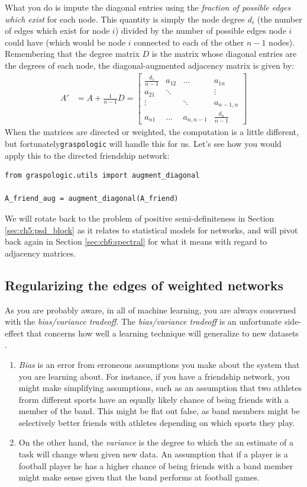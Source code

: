 What you do is impute the diagonal entries using the \emph{fraction of possible edges which exist} for each node. This quantity is simply the node degree $d_i$ (the number of edges which exist for node $i$) divided by the number of possible edges node $i$ could have (which would be node $i$ connected to each of the other $n-1$ nodes). Remembering that the degree matrix $D$ is the matrix whose diagonal entries are the degrees of each node, the diagonal-augmented adjacency matrix is given by:
\begin{align*}
    A' &= A + \frac{1}{n-1}D = \begin{bmatrix}
        \frac{d_1}{n-1} & a_{12} & ... & a_{1n} \\
        a_{21}& \ddots & & \vdots \\
        \vdots & & \ddots & a_{n-1, n} \\
        a_{n1} &...& a_{n, n-1} & \frac{d_n}{n-1}
    \end{bmatrix}
\end{align*}
When the matrices are directed or weighted, the computation is a little different, but fortunately\texttt{graspologic} will handle this for us. Let's see how you would apply this to the directed friendship network:
\begin{lstlisting}[style=python]
from graspologic.utils import augment_diagonal

A_friend_aug = augment_diagonal(A_friend)
\end{lstlisting}
We will rotate back to the problem of positive semi-definiteness in Section \ref{sec:ch5:psd_block} as it relates to statistical models for networks, and will pivot back again in Section \ref{sec:ch6:spectral} for what it means with regard to adjacency matrices.

\subsection{Regularizing the edges of weighted networks}

As you are probably aware, in all of machine learning, you are always concerned with the \emph{bias/variance tradeoff}. The \textit{bias/variance tradeoff} is an unfortunate side-effect that concerns how well a learning technique will generalize to new datasets \cite{Hastie2009}.
\begin{enumerate}
    \item \textit{Bias} is an error from erroneous assumptions you make about the system that you are learning about. For instance, if you have a friendship network, you might make simplifying assumptions, such as an assumption that two athletes frorm different sports have an equally likely chance of being friends with a member of the band. This might be flat out false, as band members might be selectively better friends with athletes depending on which sports they play.
    \item On the other hand, the \textit{variance} is the degree to which the an estimate of a task will change when given new data. An assumption that if a player is a football player he has a higher chance of being friends with a band member might make sense given that the band performs at football games. 
\end{enumerate}

